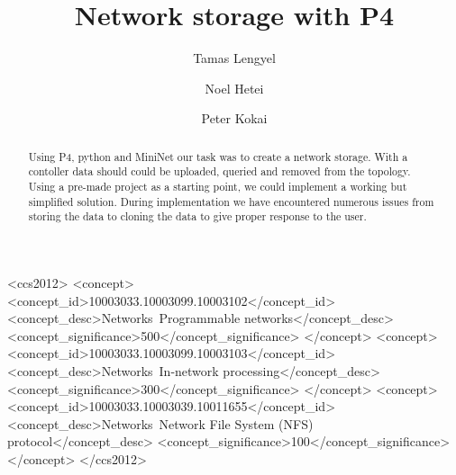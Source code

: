 \documentclass[sigconf,natbib=false]{acmart}
\begin{document}
\title{Network storage with P4}

\author{Tamas Lengyel}

\author{Noel Hetei}

\author{Peter Kokai}


\begin{abstract}
Using P4, python and MiniNet our task was to create a network storage. With a contoller data should could be uploaded, queried and removed from the topology. Using a pre-made project as a starting point, we could implement a working but simplified solution. During implementation we have encountered numerous issues from storing the data to cloning the data to give proper response to the user. 
\end{abstract}

\begin{CCSXML}
<ccs2012>
<concept>
<concept_id>10003033.10003099.10003102</concept_id>
<concept_desc>Networks~Programmable networks</concept_desc>
<concept_significance>500</concept_significance>
</concept>
<concept>
<concept_id>10003033.10003099.10003103</concept_id>
<concept_desc>Networks~In-network processing</concept_desc>
<concept_significance>300</concept_significance>
</concept>
<concept>
<concept_id>10003033.10003039.10011655</concept_id>
<concept_desc>Networks~Network File System (NFS) protocol</concept_desc>
<concept_significance>100</concept_significance>
</concept>
</ccs2012>
\end{CCSXML}



\maketitle
\end{document}
